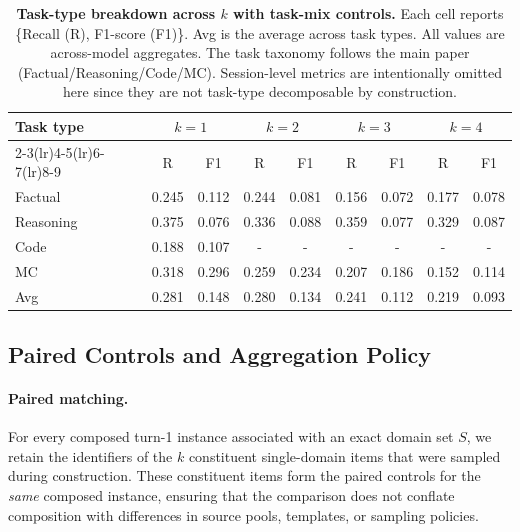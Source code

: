 \begin{table}[!ht]
\caption{\textbf{Task-type breakdown across $k$ with task-mix controls.}
Each cell reports \{Recall (R), F1-score (F1)\}. Avg is the average across task types. All values are across-model aggregates. The task taxonomy follows the main paper (Factual/Reasoning/Code/MC). Session-level metrics are intentionally omitted here since they are not task-type decomposable by construction.}
\centering
\small
\setlength{\tabcolsep}{3.2pt}
\renewcommand{\arraystretch}{1.12}

\begin{tabular}{l cc cc cc cc}
\toprule
\multirow{2}{*}{Task type} &
\multicolumn{2}{c}{$k{=}1$} &
\multicolumn{2}{c}{$k{=}2$} &
\multicolumn{2}{c}{$k{=}3$} &
\multicolumn{2}{c}{$k{=}4$} \\
\cmidrule(lr){2-3}\cmidrule(lr){4-5}\cmidrule(lr){6-7}\cmidrule(lr){8-9}
& R & F1 & R & F1 & R & F1 & R & F1 \\
\midrule
Factual   & 0.245 & 0.112 & 0.244 & 0.081 & 0.156 & 0.072 & 0.177 & 0.078 \\
Reasoning & 0.375 & 0.076 & 0.336 & 0.088 & 0.359 & 0.077 & 0.329 & 0.087 \\
Code      & 0.188 & 0.107 & - & - & - & - & - & - \\
MC        & 0.318 & 0.296 & 0.259 & 0.234 & 0.207 & 0.186 & 0.152 & 0.114 \\
\midrule
Avg  & 0.281 & 0.148 & 0.280 & 0.134 & 0.241 & 0.112 & 0.219 & 0.093 \\
\bottomrule
\end{tabular}
\label{tab:d1_tasktype_k}
\end{table}




\subsection{Paired Controls and Aggregation Policy}
\label{app:paired_protocol}

\paragraph{Paired matching.}
For every composed turn-1 instance associated with an exact domain set $S$, we retain the identifiers of the $k$ constituent single-domain items that were sampled during construction.
These constituent items form the paired controls for the \emph{same} composed instance, ensuring that the comparison does not conflate composition with differences in source pools, templates, or sampling policies.

